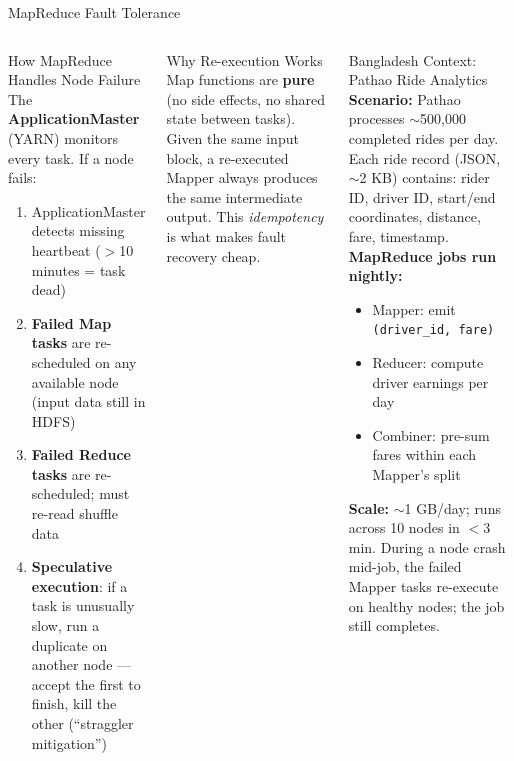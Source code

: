 \documentclass[aspectratio=169,10pt]{beamer}
\begin{document}
\begin{frame}{MapReduce Fault Tolerance}
  \begin{columns}[T]
      \begin{block}{How MapReduce Handles Node Failure}
        The \textbf{ApplicationMaster} (YARN) monitors every task.  If a node fails:
        \vspace{4pt}
        \begin{enumerate}
          \item ApplicationMaster detects missing heartbeat ($>$10 minutes = task dead)
          \item \textbf{Failed Map tasks} are re-scheduled on any available node (input data still in HDFS)
          \item \textbf{Failed Reduce tasks} are re-scheduled; must re-read shuffle data
          \item \textbf{Speculative execution}: if a task is unusually slow, run a duplicate on another node — accept the first to finish, kill the other (``straggler mitigation'')
        \end{enumerate}
      \end{block}
      \vspace{4pt}
      \begin{exampleblock}{Why Re-execution Works}
        Map functions are \textbf{pure} (no side effects, no shared state between tasks).  Given the same input block, a re-executed Mapper always produces the same intermediate output.  This \emph{idempotency} is what makes fault recovery cheap.
      \end{exampleblock}

      \begin{alertblock}{Bangladesh Context: Pathao Ride Analytics}
        \textbf{Scenario:} Pathao processes $\sim$500{,}000 completed rides per day.  Each ride record (JSON, $\sim$2 KB) contains: rider ID, driver ID, start/end coordinates, distance, fare, timestamp.
        \vspace{4pt}
        \textbf{MapReduce jobs run nightly:}
        \begin{itemize}
          \small
          \item Mapper: emit \texttt{(driver\_id, fare)}
          \item Reducer: compute driver earnings per day
          \item Combiner: pre-sum fares within each Mapper's split
        \end{itemize}
        \textbf{Scale:} $\sim$1 GB/day; runs across 10 nodes in $<$3 min.  During a node crash mid-job, the failed Mapper tasks re-execute on healthy nodes; the job still completes.
      \end{alertblock}
  \end{columns}
\end{frame}
\end{document}
